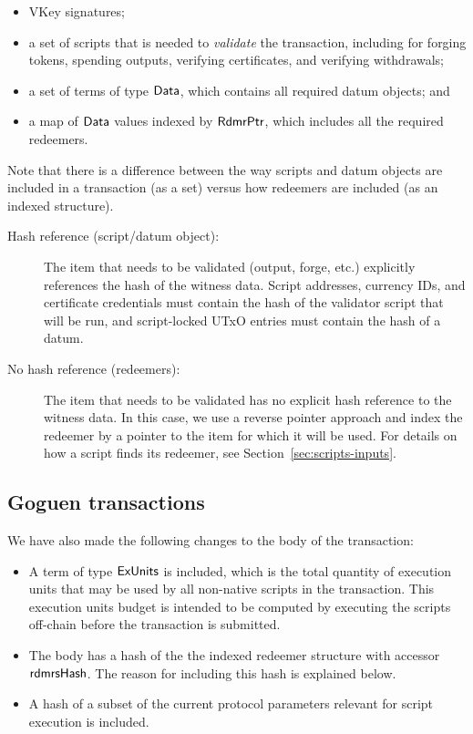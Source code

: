 \begin{itemize}
  \item VKey signatures;
  \item a set of scripts that is needed to \emph{validate} the transaction, including for forging tokens, spending outputs, verifying certificates, and
  verifying withdrawals;
  \item a set of terms of type $\mathsf{Data}$, which contains all required datum objects; and
  \item a map of $\mathsf{Data}$ values indexed by $\mathsf{RdmrPtr}$, which includes all the
  required redeemers.
\end{itemize}

Note that there is a difference between the way scripts and datum objects are included in
a transaction (as a set) versus how redeemers are included
(as an indexed structure). %

\begin{description}
\item
  [Hash reference (script/datum object):]
  The item that needs to be validated (output, forge, etc.) explicitly references the hash of
  the witness data.
  Script addresses, currency IDs, and certificate credentials must contain
  the hash of the validator script that will be run, and script-locked UTxO entries
  must contain the hash of a datum. %

  \item[No hash reference (redeemers):] The item that needs to be validated has no explicit %
  hash reference to the witness data.
  In this case, we use a reverse pointer approach and
  index the redeemer by a pointer to the item for which it will be used.
  For details on how a script finds its redeemer, see Section~\ref{sec:scripts-inputs}.
\end{description}

\subsection{Goguen transactions}
We have also made the following changes to
the body of the transaction:

\begin{itemize}
  \item A term of type $\mathsf{ExUnits}$ is included, which is the total quantity of execution units
  that may be used by all non-native scripts in the transaction.
  This execution units budget is intended to be computed
  by executing the scripts off-chain before the transaction is submitted.
  \item The body has a hash of the the indexed redeemer structure
    with accessor $\mathsf{rdmrsHash}$. The reason for including this hash is explained below.
  \item A hash of a subset of the current protocol parameters relevant for script execution is included.
\end{itemize}

